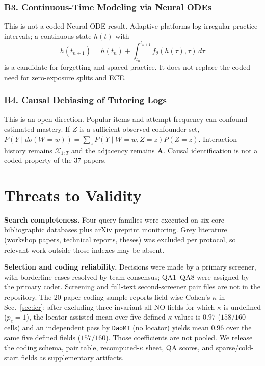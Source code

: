 \documentclass[lettersize,journal]{IEEEtran}
\begin{document}
\subsubsection{B3. Continuous-Time Modeling via Neural ODEs}
This is not a coded Neural-ODE result. Adaptive platforms log irregular practice intervals; a continuous state $h(t)$ with
\begin{equation}
h(t_{n+1}) = h(t_n) + \int_{t_n}^{t_{n+1}} f_\theta(h(\tau), \tau)\, d\tau
\end{equation}
is a candidate for forgetting and spaced practice. It does not replace the coded need for zero-exposure splits and ECE.

\subsubsection{B4. Causal Debiasing of Tutoring Logs}
This is an open direction. Popular items and attempt frequency can confound estimated mastery. If $Z$ is a sufficient observed confounder set, $P(Y \mid do(W = w)) = \sum_{z} P(Y \mid W = w, Z = z) P(Z = z)$. Interaction history remains $\mathcal{X}_{1:T}$ and the adjacency remains $\mathbf{A}$. Causal identification is not a coded property of the 37 papers.

\section{Threats to Validity}
\label{sec:validity}

\textbf{Search completeness.} Four query families were executed on six core bibliographic databases plus arXiv preprint monitoring. Grey literature (workshop papers, technical reports, theses) was excluded per protocol, so relevant work outside those indexes may be absent.

\textbf{Selection and coding reliability.} Decisions were made by a primary screener, with borderline cases resolved by team consensus; QA1--QA8 were assigned by the primary coder. Screening and full-text second-screener pair files are not in the repository. The 20-paper coding sample reports field-wise Cohen's $\kappa$ in Sec.~\ref{sec:icr}: after excluding three invariant all-NO fields for which $\kappa$ is undefined ($p_e=1$), the locator-assisted mean over five defined $\kappa$ values is $0.97$ ($158/160$ cells) and an independent pass by \texttt{DaoMT} (no locator) yields mean $0.96$ over the same five defined fields ($157/160$). Those coefficients are not pooled. We release the coding schema, pair table, recomputed-$\kappa$ sheet, QA scores, and sparse/cold-start fields as supplementary artifacts.
\end{document}
